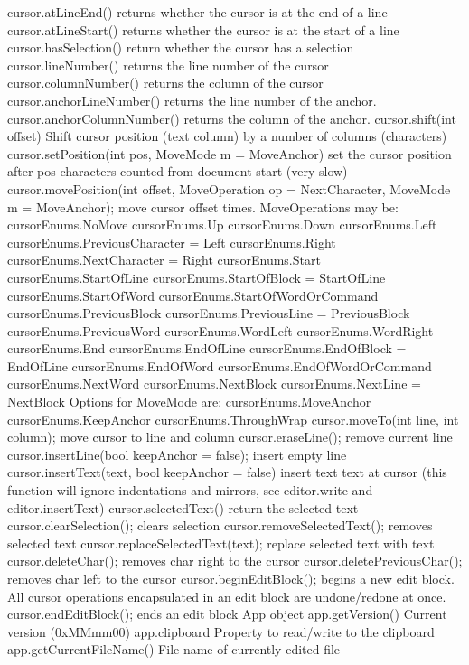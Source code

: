 \documentclass{article}
\begin{document}
	cursor.atLineEnd()	returns whether the cursor is at the end of a line
	cursor.atLineStart()	returns whether the cursor is at the start of a line
	cursor.hasSelection()	return whether the cursor has a selection
	cursor.lineNumber()	returns the line number of the cursor
	cursor.columnNumber()	returns the column of the cursor
	cursor.anchorLineNumber()	returns the line number of the anchor.
	cursor.anchorColumnNumber()	returns the column of the anchor.
	cursor.shift(int offset)	Shift cursor position (text column) by a number of columns (characters)
	cursor.setPosition(int pos, MoveMode m = MoveAnchor)	set the cursor position after pos-characters counted from document start (very slow)
	cursor.movePosition(int offset, MoveOperation op = NextCharacter, MoveMode m = MoveAnchor);	move cursor offset times. MoveOperations may be:
	cursorEnums.NoMove
	cursorEnums.Up
	cursorEnums.Down
	cursorEnums.Left
	cursorEnums.PreviousCharacter = Left
	cursorEnums.Right
	cursorEnums.NextCharacter = Right
	cursorEnums.Start
	cursorEnums.StartOfLine
	cursorEnums.StartOfBlock = StartOfLine
	cursorEnums.StartOfWord
	cursorEnums.StartOfWordOrCommand
	cursorEnums.PreviousBlock
	cursorEnums.PreviousLine = PreviousBlock
	cursorEnums.PreviousWord
	cursorEnums.WordLeft
	cursorEnums.WordRight
	cursorEnums.End
	cursorEnums.EndOfLine
	cursorEnums.EndOfBlock = EndOfLine
	cursorEnums.EndOfWord
	cursorEnums.EndOfWordOrCommand
	cursorEnums.NextWord
	cursorEnums.NextBlock
	cursorEnums.NextLine = NextBlock
	Options for MoveMode are:
	cursorEnums.MoveAnchor
	cursorEnums.KeepAnchor
	cursorEnums.ThroughWrap
	cursor.moveTo(int line, int column);	move cursor to line and column
	cursor.eraseLine();	remove current line
	cursor.insertLine(bool keepAnchor = false);	insert empty line
	cursor.insertText(text, bool keepAnchor = false)	insert text text at cursor (this function will ignore indentations and mirrors, see editor.write and editor.insertText)
	cursor.selectedText()	return the selected text
	cursor.clearSelection();	clears selection
	cursor.removeSelectedText();	removes selected text
	cursor.replaceSelectedText(text);	replace selected text with text
	cursor.deleteChar();	removes char right to the cursor
	cursor.deletePreviousChar();	removes char left to the cursor
	cursor.beginEditBlock();	begins a new edit block. All cursor operations encapsulated in an edit block are undone/redone at once.
	cursor.endEditBlock();	ends an edit block
	App object
	app.getVersion()	Current version (0xMMmm00)
	app.clipboard	Property to read/write to the clipboard
	app.getCurrentFileName()	File name of currently edited file
\end{document}
